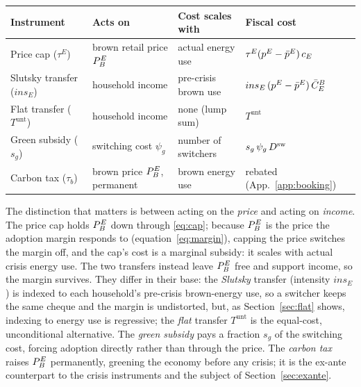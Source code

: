 \begin{table}[H]
\centering
{}
\small
\begin{tabular}{llll}
\toprule
Instrument & Acts on & Cost scales with & Fiscal cost \\
\midrule
Price cap ($\tau^E$) & brown retail price $P^{E}_{B}$ & actual energy use & $\tau^E(p^{E}-\bar p^E)\,c_E$ \\
Slutsky transfer ($ins_E$) & household income & pre-crisis brown use & $ins_E\,(p^{E}-\bar p^E)\,\bar C^B_E$ \\
Flat transfer ($T^{\mathrm{unt}}$) & household income & none (lump sum) & $T^{\mathrm{unt}}$ \\
Green subsidy ($s_g$) & switching cost $\psi_g$ & number of switchers & $s_g\,\psi_g\,D^{\mathrm{sw}}$ \\
\midrule
Carbon tax ($\tau_b$) & brown price $P^{E}_{B}$, permanent & brown energy use & rebated (App.~\ref{app:booking}) \\
\bottomrule
\end{tabular}
\label{tab:instruments}
\end{table}

The distinction that matters is between acting on the \emph{price} and acting
on \emph{income}. The price cap holds $P^{E}_{B}$ down through \eqref{eq:cap}; because
$P^{E}_{B}$ is the price the adoption margin responds to (equation~\eqref{eq:margin}),
capping the price switches the margin off, and the cap's cost is a marginal
subsidy: it scales with actual crisis energy use. The two transfers instead leave
$P^{E}_{B}$ free and support income, so the margin survives. They differ in their base: the
\emph{Slutsky} transfer (intensity $ins_E$) is indexed to each household's pre-crisis
brown-energy use, so a switcher keeps the same cheque and the margin is
undistorted, but, as Section~\ref{sec:flat} shows, indexing to energy use is
regressive; the \emph{flat} transfer $T^{\mathrm{unt}}$ is the equal-cost,
unconditional alternative. The \emph{green subsidy} pays a
fraction $s_g$ of the switching cost, forcing adoption directly rather than through
the price. The \emph{carbon tax} raises $P^{E}_{B}$ permanently, greening the economy
before any crisis; it is the ex-ante counterpart to the crisis instruments and the
subject of Section~\ref{sec:exante}.

